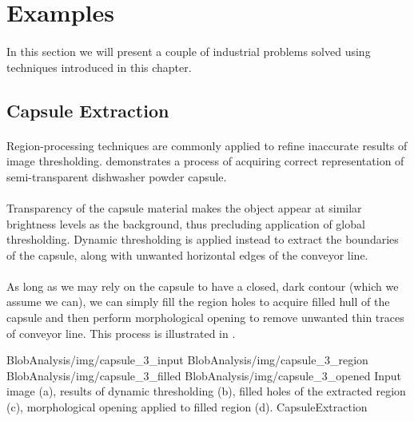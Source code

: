 \section{Examples}

\paragraph*{}
In this section we will present a couple of industrial problems solved using techniques introduced in this chapter.

\subsection{Capsule Extraction}

\paragraph*{}
Region-processing techniques are commonly applied to refine inaccurate results of image thresholding.  demonstrates a process of acquiring correct representation of semi-transparent dishwasher powder capsule. 

\paragraph*{}
Transparency of the capsule material makes the object appear at similar brightness levels as the background, thus precluding application of global thresholding. Dynamic thresholding is applied instead to extract the boundaries of the capsule, along with unwanted horizontal edges of the conveyor line.

\paragraph*{}
As long as we may rely on the capsule to have a closed, dark contour (which we assume we can), we can simply fill the region holes to acquire filled hull of the capsule and then perform morphological opening to remove unwanted thin traces of conveyor line. This process is illustrated in .

\fourFigures
{BlobAnalysis/img/capsule_3_input}
{BlobAnalysis/img/capsule_3_region}
{BlobAnalysis/img/capsule_3_filled}
{BlobAnalysis/img/capsule_3_opened}
{Input image (a), results of dynamic thresholding (b), filled holes of the extracted region (c), morphological opening applied to filled region (d).}
{CapsuleExtraction}
{\basicWidth}

